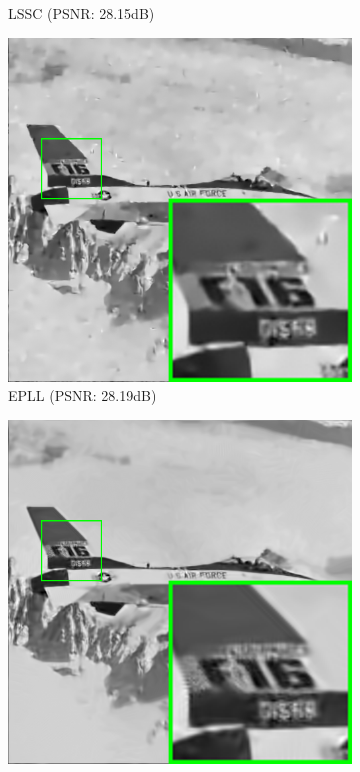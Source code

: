 \begin{figure}
\begin{subfigure}[t]{0.2\textwidth}
		\caption{LSSC (PSNR: 28.15dB)}
    \end{subfigure}
    \hfill
    \begin{subfigure}[t]{0.2\textwidth}
        \centering
        \includegraphics[width=1\textwidth]{images/pgpd/br_EPLL_50_airplane.png}
		\caption{EPLL (PSNR: 28.19dB)}
    \end{subfigure}
    \hfill
    \begin{subfigure}[t]{0.2\textwidth}
        \centering
        \includegraphics[width=1\textwidth]{images/pgpd/br_NCSR_50_airplane.png}

\end{subfigure}
\end{figure}
